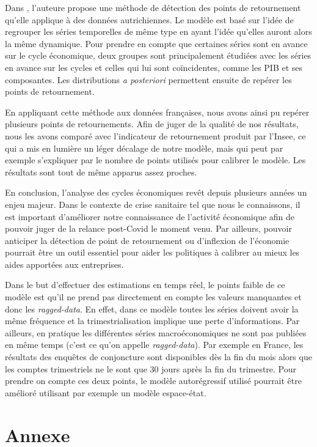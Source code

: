 \documentclass[10pt,french,french]{article}
\begin{document}
Dans \cite{Kaufmann}, l'auteure propose une méthode de détection des points de retournement qu'elle applique à des données autrichiennes.
Le modèle est basé sur l'idée de regrouper les séries temporelles de même type en ayant l'idée qu'elles auront alors la même dynamique.
Pour prendre en compte que certaines séries sont en avance sur le cycle économique, deux groupes sont principalement étudiées avec les séries en avance sur les cycles et celles qui lui sont coïncidentes, comme les PIB et ses composantes.
Les distributions \emph{a posteriori} permettent ensuite de repérer les points de retournement.

En appliquant cette méthode aux données françaises, nous avons ainsi pu repérer plusieurs points de retournements.
Afin de juger de la qualité de nos résultats, nous les avons comparé avec l'indicateur de retournement produit par l'Insee, ce qui a mis en lumière un léger décalage de notre modèle, mais qui peut par exemple s'expliquer par le nombre de points utilisés pour calibrer le modèle.
Les résultats sont tout de même apparus assez proches.

En conclusion, l'analyse des cycles économiques revêt depuis plusieurs années un enjeu majeur.
Dans le contexte de crise sanitaire tel que nous le connaissons, il est important d'améliorer notre connaissance de l'activité économique afin de pouvoir juger de la relance post-Covid le moment venu.
Par ailleurs, pouvoir anticiper la détection de point de retournement ou d'inflexion de l'économie pourrait être un outil essentiel pour aider les politiques à calibrer au mieux les aides apportées aux entreprises.

Dans le but d'effectuer des estimations en temps réel, le points faible de ce modèle est qu'il ne prend pas directement en compte les valeurs manquantes et donc les \emph{ragged-data}. En effet, dans ce modèle toutes les séries doivent avoir la même fréquence et la trimestrialisation implique une perte d'informations. Par ailleurs, en pratique les différentes séries macroéconomiques ne sont pas publiées en même temps (c'est ce qu'on appelle \emph{ragged-data}).
Par exemple en France, les résultats des enquêtes de conjoncture sont disponibles dès la fin du mois alors que les comptes trimestriels ne le sont que 30 jours après la fin du trimestre.
Pour prendre on compte ces deux points, le modèle autorégressif utilisé pourrait être amélioré utilisant par exemple un modèle espace-état.

\newpage
\appendix

\hypertarget{annexe}{%
\section{Annexe}\label{annexe}}
\end{document}
